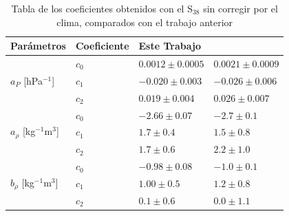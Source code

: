 					\begin{table}[H]
						\centering
						\begin{tabular}{|l|l|l|l|}\hline
						 \textbf{Parámetros}						& \textbf{Coeficiente}	& \textbf{Este Trabajo} & \textbf{ \cite{aab2017impact}}	\\ \hline
						 \multirow{3}{*}{$a_P$ [hPa$^{-1}$]}  		&  $c_0$				& $ 0.0012\pm0.0005$	& $ 0.0021 \pm 0.0009 $	\\ \cline{2-4} %
						 											&  $c_1$				& $-0.020\pm0.003$		& $-0.026  \pm 0.006 $	\\ \cline{2-4} 
																	&  $c_2$				& $ 0.019\pm0.004$		& $0.026   \pm 0.007 $	\\ \hline %
						
						 \multirow{3}{*}{$a_\rho$ [kg$^{-1}$m$^3$]} &  $c_0$			& $-2.66   \pm 0.07$	& $ -2.7  \pm 0.1  $\\ \cline{2-4} 
						 											&  $c_1$			& $ 1.7    \pm 0.4 $	& $ 1.5   \pm 0.8  $\\ \cline{2-4} 
																	&  $c_2$			& $ 1.7    \pm 0.6 $	& $ 2.2   \pm 1.0  $\\ \hline %
						
						\multirow{3}{*}{$b_\rho$ [kg$^{-1}$m$^3$]} 	&  $c_0$			& $-0.98    \pm 0.08$	& $-1.0   \pm 0.1 $	\\ \cline{2-4} 
																	&  $c_1$			& $ 1.00    \pm 0.5$	& $ 1.2   \pm 0.8  $	\\ \cline{2-4} 
																	&  $c_2$			& $ 0.1    \pm 0.6$		& $ 0.0   \pm 1.1  $	\\ \hline 
						
						\end{tabular}	
						\caption{Tabla de los coeficientes obtenidos con el S$_{38}$ sin corregir por el clima, comparados con el trabajo anterior} \label{tabla:cuadratica_ICRC_2019_S38}
					\end{table}

	


